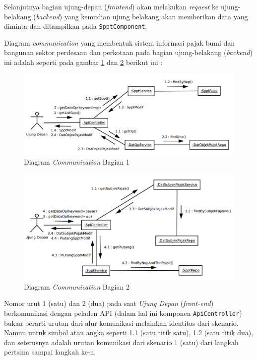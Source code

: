 \documentclass[pdftex,12pt, oneside]{article}
\begin{document}
Selanjutnya bagian ujung-depan (\textit{frontend}) akan melakukan \textit{request} ke ujung-belakang (\textit{backend}) yang kemudian ujung belakang akan memberikan data yang diminta dan ditampilkan pada \texttt{SpptComponent}.

Diagram \textit{communication} yang membentuk sistem informasi pajak bumi dan bangunan sektor perdesaan dan perkotaan pada bagian ujung-belakang (\textit{backend}) ini adalah seperti pada gambar \ref{fig:comm-dia-1} dan \ref{fig:comm-dia-2} berikut ini :

\begin{figure}[H]
	\centering
	\includegraphics[width=1\textwidth]{./resources/comm-dia-1}
	\caption{Diagram \textit{Communication} Bagian 1}
	\label{fig:comm-dia-1}
\end{figure}

\begin{figure}[H]
	\centering
	\includegraphics[width=1\textwidth]{./resources/comm-dia-2}
	\caption{Diagram \textit{Communication} Bagian 2}
	\label{fig:comm-dia-2}
\end{figure}

Nomor urut 1 (satu) dan 2 (dua) pada saat \textit{Ujung Depan} (\textit{front-end}) berkomunikasi dengan peladen API (dalam hal ini komponen \texttt{ApiController}) bukan berarti urutan dari alur komunikasi melainkan identitas dari skenario. Namun untuk simbol atau angka seperti 1.1 (satu titik satu), 1.2 (satu titik dua), dan seterusnya adalah urutan komunikasi dari skenario 1 (satu) dari langkah pertama sampai langkah ke-n.
\end{document}
